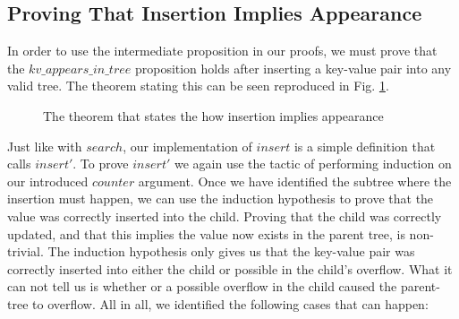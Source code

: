 \subsection{Proving That Insertion Implies Appearance}
\label{sec:proving_insert_appears}
In order to use the intermediate proposition in our proofs, we must prove that the $kv\_appears\_in\_tree$ proposition holds after inserting a key-value pair into any valid tree. The theorem stating this can be seen reproduced in Fig. \ref{fig:insert_impl_appears}.

\begin{figure}
  
  \caption{The theorem that states the how insertion implies appearance}
  \label{fig:insert_impl_appears}
\end{figure}

Just like with $search$, our implementation of $insert$ is a simple definition that calls $insert'$. To prove $insert'$ we again use the tactic of performing induction on our introduced $counter$ argument. Once we have identified the subtree where the insertion must happen, we can use the induction hypothesis to prove that the value was correctly inserted into the child. Proving that the child was correctly updated, and that this implies the value now exists in the parent tree, is non-trivial. The induction hypothesis only gives us that the key-value pair was correctly inserted into either the child or possible in the child's overflow. What it can not tell us is whether or a possible overflow in the child caused the parent-tree to overflow. All in all, we identified the following cases that can happen:

